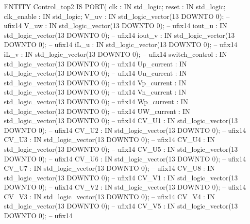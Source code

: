 \begin{mylisting}[language=VHDL,caption=MSSRDCDB制御\&SVPWMモジュール,label=appF_Control_top2_module_VHDL]
ENTITY Control_top2 IS
  PORT( clk                               :   IN    std_logic;
        reset                             :   IN    std_logic;
        clk_enable                        :   IN    std_logic;
        V_uv                              :   IN    std_logic_vector(13 DOWNTO 0);  -- ufix14
        V_uw                              :   IN    std_logic_vector(13 DOWNTO 0);  -- ufix14
        iout_u                            :   IN    std_logic_vector(13 DOWNTO 0);  -- ufix14
        iout_v                            :   IN    std_logic_vector(13 DOWNTO 0);  -- ufix14
        iL_u                              :   IN    std_logic_vector(13 DOWNTO 0);  -- ufix14
        iL_v                              :   IN    std_logic_vector(13 DOWNTO 0);  -- ufix14
        switch_control                    :   IN    std_logic_vector(13 DOWNTO 0);  -- ufix14
        Up_current                        :   IN    std_logic_vector(13 DOWNTO 0);  -- ufix14
        Un_current                        :   IN    std_logic_vector(13 DOWNTO 0);  -- ufix14
        Vp_current                        :   IN    std_logic_vector(13 DOWNTO 0);  -- ufix14
        Vn_current                        :   IN    std_logic_vector(13 DOWNTO 0);  -- ufix14
        Wp_current                        :   IN    std_logic_vector(13 DOWNTO 0);  -- ufix14
        UW_current                        :   IN    std_logic_vector(13 DOWNTO 0);  -- ufix14
        CV_U1                             :   IN    std_logic_vector(13 DOWNTO 0);  -- ufix14
        CV_U2                             :   IN    std_logic_vector(13 DOWNTO 0);  -- ufix14
        CV_U3                             :   IN    std_logic_vector(13 DOWNTO 0);  -- ufix14
        CV_U4                             :   IN    std_logic_vector(13 DOWNTO 0);  -- ufix14
        CV_U5                             :   IN    std_logic_vector(13 DOWNTO 0);  -- ufix14
        CV_U6                             :   IN    std_logic_vector(13 DOWNTO 0);  -- ufix14
        CV_U7                             :   IN    std_logic_vector(13 DOWNTO 0);  -- ufix14
        CV_U8                             :   IN    std_logic_vector(13 DOWNTO 0);  -- ufix14
        CV_V1                             :   IN    std_logic_vector(13 DOWNTO 0);  -- ufix14
        CV_V2                             :   IN    std_logic_vector(13 DOWNTO 0);  -- ufix14
        CV_V3                             :   IN    std_logic_vector(13 DOWNTO 0);  -- ufix14
        CV_V4                             :   IN    std_logic_vector(13 DOWNTO 0);  -- ufix14
        CV_V5                             :   IN    std_logic_vector(13 DOWNTO 0);  -- ufix14

\end{mylisting}
